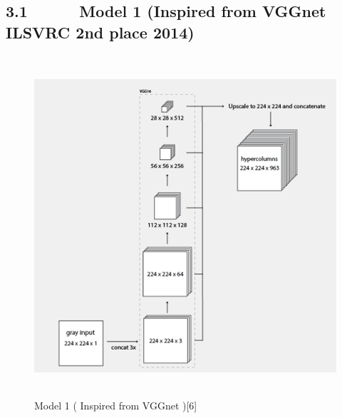 \documentclass[12pt]{article}
\begin{document}
\subsection*{3.1\ \ \ \ \ \  Model 1 (Inspired from VGGnet ILSVRC 2nd place 2014)}
\begin{Center}



\begin{figure}[H]
	\begin{Center}
		\includegraphics[width=5.13in,height=4.98in]{./media/image7.png}
		\caption{Model 1 ( Inspired from VGGnet  )[6]}
		\label{fig:Model 1 ( Inspired from VGGnet  )[6]}
	\end{Center}
\end{figure}



\textbf{\\
}
\end{Center}\par
\end{document}
